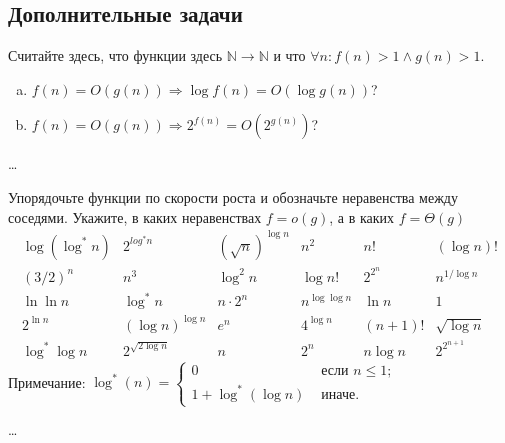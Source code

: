 \subsection*{Дополнительные задачи}

\begin{problem}
    Считайте здесь, что функции здесь $\mathbb{N} \to \mathbb{N}$ и что $\forall n : f(n) > 1 \land g(n) > 1$.
    \begin{enumerate}[(a)]
        \item $f(n) = O(g(n)) \Rightarrow \log f(n) = O(\log g(n))$?
        \item $f(n) = O(g(n)) \Rightarrow 2^{f(n)} = O(2^{g(n)})$?
    \end{enumerate}
\end{problem}

\begin{solution}
    \ldots
\end{solution}


\begin{problem}
    Упорядочьте функции по скорости роста и обозначьте неравенства между соседями.
    Укажите, в каких неравенствах $f = o(g)$, а в каких $f = \Theta(g)$
    $$
    \begin{array}{cccccc}
        \log(\log^* n) & 2^{log^* n} & (\sqrt{n})^{\log n} & n^2 & n! & (\log n)! \\
        (3 \slash 2)^n & n^3 & \log^2 n & \log n! & 2^{2^n} & n^{1 \slash \log n} \\
        \ln \ln n & \log^* n & n \cdot 2^n & n^{\log \log n} & \ln n & 1 \\
        2^{\ln n} & (\log n)^{\log n} & e^n & 4^{\log n} & (n + 1)! & \sqrt{\log n} \\
        \log^* \log n & 2^{\sqrt{2 \log n}} & n & 2^n & n \log n & 2^{2^{n + 1}}
    \end{array}
    $$
    Примечание: $\log^*(n) = \left\{
        \begin{array}{ll}
            0 & \texttt{ если } n \leq 1;\\
            1 + \log^*(\log n) & \texttt{ иначе.}
        \end{array}
        \right.$
\end{problem}

\begin{solution}
    \ldots
\end{solution}


\clearpage
